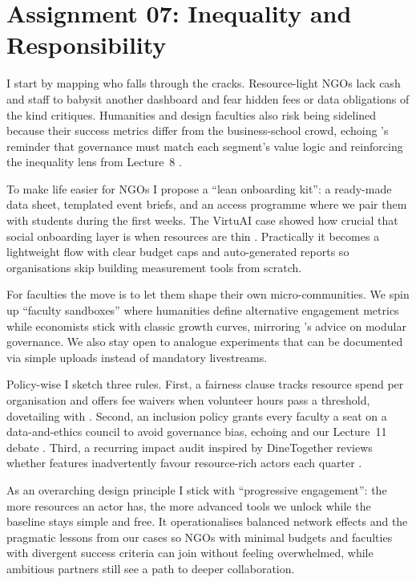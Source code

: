 \section*{Assignment 07: Inequality and Responsibility}

I start by mapping who falls through the cracks. Resource-light NGOs lack cash and staff to babysit another dashboard and fear hidden fees or data obligations of the kind \citet{Srnicek2017} critiques. Humanities and design faculties also risk being sidelined because their success metrics differ from the business-school crowd, echoing \citet{Choudary2016}'s reminder that governance must match each segment’s value logic and reinforcing the inequality lens from Lecture~8 \citep{Lecture08}.

To make life easier for NGOs I propose a ``lean onboarding kit'': a ready-made data sheet, templated event briefs, and an access programme where we pair them with students during the first weeks. The VirtuAI case showed how crucial that social onboarding layer is when resources are thin \citep{Gunasilan2024}. Practically it becomes a lightweight flow with clear budget caps and auto-generated reports so organisations skip building measurement tools from scratch.

For faculties the move is to let them shape their own micro-communities. We spin up ``faculty sandboxes'' where humanities define alternative engagement metrics while economists stick with classic growth curves, mirroring \citet{Reillier2017}'s advice on modular governance. We also stay open to analogue experiments that can be documented via simple uploads instead of mandatory livestreams.

Policy-wise I sketch three rules. First, a fairness clause tracks resource spend per organisation and offers fee waivers when volunteer hours pass a threshold, dovetailing with \citet{ShapiroVarian1999}. Second, an inclusion policy grants every faculty a seat on a data-and-ethics council to avoid governance bias, echoing \citet{Zuboff2019} and our Lecture~11 debate \citep{Lecture11}. Third, a recurring impact audit inspired by DineTogether reviews whether features inadvertently favour resource-rich actors each quarter \citep{Rennella2023}.

As an overarching design principle I stick with ``progressive engagement'': the more resources an actor has, the more advanced tools we unlock while the baseline stays simple and free. It operationalises balanced network effects and the pragmatic lessons from our cases so NGOs with minimal budgets and faculties with divergent success criteria can join without feeling overwhelmed, while ambitious partners still see a path to deeper collaboration.

